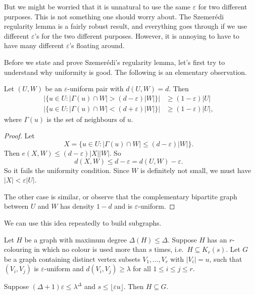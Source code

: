 \documentclass[a4paper]{article}
\begin{document}
But we might be worried that it is unnatural to use the same $\varepsilon$ for two different purposes. This is not something one should worry about. The Szemer\'edi regularity lemma is a fairly robust result, and everything goes through if we use different $\varepsilon$'s for the two different purposes. However, it is annoying to have to have many different $\varepsilon$'s floating around.

Before we state and prove Szemer\'edi's regularity lemma, let's first try to understand why uniformity is good. The following is an elementary observation.
\begin{lemma}
  Let $(U, W)$ be an $\varepsilon$-uniform pair with $d(U, W) = d$. Then
  \begin{align*}
    |\{u \in U: |\Gamma(u) \cap W| > (d - \varepsilon) |W|\}| &\geq (1 - \varepsilon)|U|\\
    |\{u \in U: |\Gamma(u) \cap W| < (d + \varepsilon) |W|\}| &\geq (1 - \varepsilon)|U|,
  \end{align*}
  where $\Gamma(u)$ is the set of neighbours of $u$.
\end{lemma}

\begin{proof}
  Let
  \[
    X = \{u \in U: |\Gamma(u) \cap W| \leq (d - \varepsilon)|W|\}.
  \]
  Then $e(X, W) \leq (d - \varepsilon) |X||W|$. So
  \[
    d(X, W) \leq d - \varepsilon = d(U, W) - \varepsilon.
  \]
  So it fails the uniformity condition. Since $W$ is definitely not small, we must have $|X| < \varepsilon |U|$.

  The other case is similar, or observe that the complementary bipartite graph between $U$ and $W$ has density $1 - d$ and is $\varepsilon$-uniform.
\end{proof}

We can use this idea repeatedly to build subgraphs.
\begin{lemma}
  Let $H$ be a graph with maximum degree $\Delta(H) \leq \Delta$. Suppose $H$ has an $r$-colouring in which no colour is used more than $s$ times, i.e.\ $H \subseteq K_r(s)$. Let $G$ be a graph containing distinct vertex subsets $V_1, \ldots, V_r$ with $|V_i| = u$, such that $(V_i, V_j)$ is $\varepsilon$-uniform and $d(V_i, V_j) \geq \lambda$ for all $1 \leq i \leq j \leq r$.

  Suppose $(\Delta + 1) \varepsilon \leq \lambda^\Delta$ and $s \leq \lfloor \varepsilon u\rfloor$. Then $H \subseteq G$.
\end{lemma}
\end{document}

